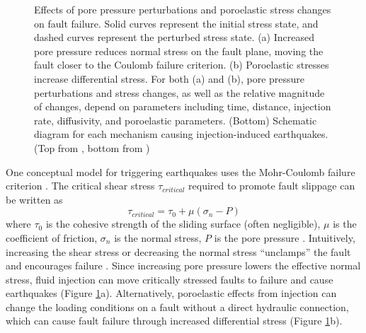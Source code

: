 \begin{figure}
	\caption[Effects of pore pressure perturbations and poroelastic stress changes on fault failure]{
		Effects of pore pressure perturbations and poroelastic stress changes on fault failure. Solid curves represent the initial stress state, and dashed curves represent the perturbed stress state. (a) Increased pore pressure reduces normal stress on the fault plane, moving the fault closer to the Coulomb failure criterion. (b) Poroelastic stresses increase differential stress. For both (a) and (b), pore pressure perturbations and stress changes, as well as the relative magnitude of changes, depend on parameters including time, distance, injection rate, diffusivity, and poroelastic parameters.
		(Bottom) Schematic diagram for each mechanism causing injection-induced earthquakes.
		(Top from \cite{Keranen2018InducedSeismicity}, bottom from \cite{Ellsworth2013InjectionInducedEarthquakes})
	}
	\label{fig:mohr-circles}
\end{figure}

One conceptual model for triggering earthquakes uses the Mohr-Coulomb failure criterion \citep{Hubbert1959RoleFluidPressure}.
The critical shear stress $\tau_{critical}$ required to promote fault slippage can be written as
\begin{equation}
\tau_{critical} = \tau_0 + \mu (\sigma_n - P)
\end{equation}
where $\tau_0$ is the cohesive strength of the sliding surface (often negligible), $\mu$ is the coefficient of friction, $\sigma_n$ is the normal stress, $P$ is the pore pressure \citep{Nicholson1990EarthquakeHazardAssociated, Ellsworth2013InjectionInducedEarthquakes}. Intuitively, increasing the shear stress or decreasing the normal stress ``unclamps'' the fault and encourages failure \citep{Shearer2019IntroductionSeismology}. Since increasing pore pressure lowers the effective normal stress, fluid injection can move critically stressed faults to failure and cause earthquakes (Figure \ref{fig:mohr-circles}a).
Alternatively, poroelastic effects from injection can change the loading conditions on a fault without a direct hydraulic connection, which can cause fault failure through increased differential stress (Figure \ref{fig:mohr-circles}b).



